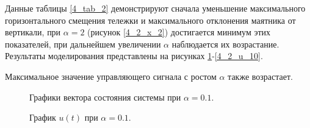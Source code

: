 Данные таблицы \ref{4_tab_2} демонстрируют сначала уменьшение максимального горизонтального смещения тележки и максимального отклонения маятника от вертикали, при $\alpha=2$ (рисунок \ref{4_2_x_2}) достигается минимум этих показателей, при дальнейшем увеличении $\alpha$ наблюдается их возрастание. Результаты моделирования представлены на рисунках \ref{4_2_x_01}-\ref{4_2_u_10}.

Максимальное значение управляющего сигнала с ростом $\alpha$ также возрастает.

\begin{figure}[!h]
	\caption{Графики вектора состояния системы при $\alpha = 0.1$.}
	\label{4_2_x_01}
\end{figure}

\begin{figure}[!h]
	\caption{График $u(t)$ при $\alpha = 0.1$.}
	\label{4_2_u_01}
\end{figure}

